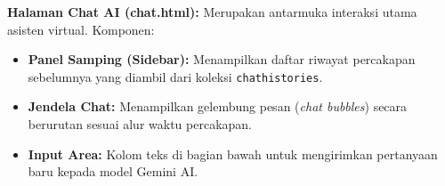 \textbf{Halaman Chat AI (chat.html):}
Merupakan antarmuka interaksi utama asisten virtual. Komponen:
\begin{itemize}[leftmargin=*]
    \item \textbf{Panel Samping (Sidebar):} Menampilkan daftar riwayat percakapan sebelumnya yang diambil dari koleksi \texttt{chathistories}.
    \item \textbf{Jendela Chat:} Menampilkan gelembung pesan (\textit{chat bubbles}) secara berurutan sesuai alur waktu percakapan.
    \item \textbf{Input Area:} Kolom teks di bagian bawah untuk mengirimkan pertanyaan baru kepada model Gemini AI.
\end{itemize}
